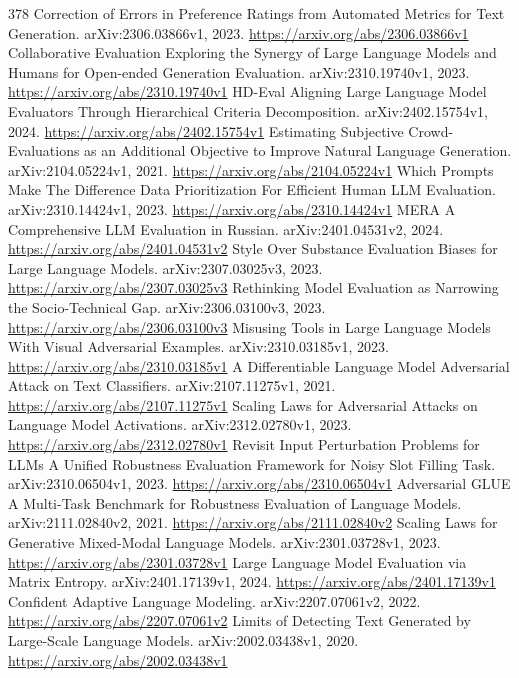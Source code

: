 \documentclass[11pt]{article}
\begin{document}
\begin{thebibliography}{378}
 Correction of Errors in Preference Ratings from Automated Metrics for Text Generation. arXiv:2306.03866v1, 2023. \url{https://arxiv.org/abs/2306.03866v1}
 Collaborative Evaluation Exploring the Synergy of Large Language Models and Humans for Open-ended Generation Evaluation. arXiv:2310.19740v1, 2023. \url{https://arxiv.org/abs/2310.19740v1}
 HD-Eval Aligning Large Language Model Evaluators Through Hierarchical Criteria Decomposition. arXiv:2402.15754v1, 2024. \url{https://arxiv.org/abs/2402.15754v1}
 Estimating Subjective Crowd-Evaluations as an Additional Objective to Improve Natural Language Generation. arXiv:2104.05224v1, 2021. \url{https://arxiv.org/abs/2104.05224v1}
 Which Prompts Make The Difference Data Prioritization For Efficient Human LLM Evaluation. arXiv:2310.14424v1, 2023. \url{https://arxiv.org/abs/2310.14424v1}
 MERA A Comprehensive LLM Evaluation in Russian. arXiv:2401.04531v2, 2024. \url{https://arxiv.org/abs/2401.04531v2}
 Style Over Substance Evaluation Biases for Large Language Models. arXiv:2307.03025v3, 2023. \url{https://arxiv.org/abs/2307.03025v3}
 Rethinking Model Evaluation as Narrowing the Socio-Technical Gap. arXiv:2306.03100v3, 2023. \url{https://arxiv.org/abs/2306.03100v3}
 Misusing Tools in Large Language Models With Visual Adversarial Examples. arXiv:2310.03185v1, 2023. \url{https://arxiv.org/abs/2310.03185v1}
 A Differentiable Language Model Adversarial Attack on Text Classifiers. arXiv:2107.11275v1, 2021. \url{https://arxiv.org/abs/2107.11275v1}
 Scaling Laws for Adversarial Attacks on Language Model Activations. arXiv:2312.02780v1, 2023. \url{https://arxiv.org/abs/2312.02780v1}
 Revisit Input Perturbation Problems for LLMs A Unified Robustness Evaluation Framework for Noisy Slot Filling Task. arXiv:2310.06504v1, 2023. \url{https://arxiv.org/abs/2310.06504v1}
 Adversarial GLUE A Multi-Task Benchmark for Robustness Evaluation of Language Models. arXiv:2111.02840v2, 2021. \url{https://arxiv.org/abs/2111.02840v2}
 Scaling Laws for Generative Mixed-Modal Language Models. arXiv:2301.03728v1, 2023. \url{https://arxiv.org/abs/2301.03728v1}
 Large Language Model Evaluation via Matrix Entropy. arXiv:2401.17139v1, 2024. \url{https://arxiv.org/abs/2401.17139v1}
 Confident Adaptive Language Modeling. arXiv:2207.07061v2, 2022. \url{https://arxiv.org/abs/2207.07061v2}
 Limits of Detecting Text Generated by Large-Scale Language Models. arXiv:2002.03438v1, 2020. \url{https://arxiv.org/abs/2002.03438v1}

\end{thebibliography}
\end{document}
